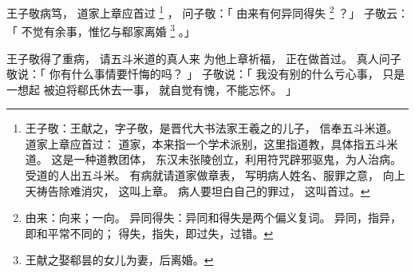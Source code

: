 
\switchcolumn*[\section{}]

王子敬病笃，
道家上章应首过%
\footnote{%
    王子敬：王献之，字子敬，是晋代大书法家王羲之的儿子，
            信奉五斗米道。
    道家上章应首过：
            道家，本来指一个学术派别，这里指道教，具体指五斗米道。
            这是一种道教团体，
            东汉未张陵创立，利用符咒辟邪驱鬼，为人治病。
            受道的人出五斗米。
            有病就请道家做章表，
            写明病人姓名、服罪之意，
            向上天祷告除难消灾，
            这叫上章。
            病人要坦白自己的罪过，
            这叫首过。
}%
，
问子敬：「
    由来有何异同得失%
    \footnote{%
        由来：向来；一向。
        异同得失：异同和得失是两个偏义复词。
                  异同，指异，即和平常不同的；
                  得失，指失，即过失，过错。
    }%
？」
子敬云：「
    不觉有余事，惟忆与郗家离婚%
    \footnote{%
        王献之娶郗昙的女儿为妻，后离婚。       
    }%
。」

\switchcolumn

王子敬得了重病，
请五斗米道的真人来
为他上章祈福，
正在做首过。
真人问子敬说：「
    你有什么事情要忏悔的吗？
」
子敬说：「
  我没有别的什么亏心事，
  只是一想起
  被迫将郗氏休去一事，
  就自觉有愧，不能忘怀。
」

